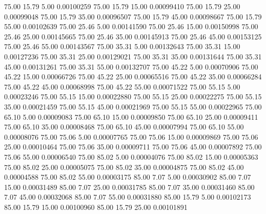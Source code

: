      75.00     15.79      5.00     0.00100259
     75.00     15.79     15.00     0.00099410
     75.00     15.79     25.00     0.00099048
     75.00     15.79     35.00     0.00096507
     75.00     15.79     45.00     0.00098667
     75.00     15.79     55.00     0.00102639
     75.00     25.46      5.00     0.00141590
     75.00     25.46     15.00     0.00150998
     75.00     25.46     25.00     0.00145665
     75.00     25.46     35.00     0.00145913
     75.00     25.46     45.00     0.00153125
     75.00     25.46     55.00     0.00143567
     75.00     35.31      5.00     0.00132643
     75.00     35.31     15.00     0.00127236
     75.00     35.31     25.00     0.00129021
     75.00     35.31     35.00     0.00131644
     75.00     35.31     45.00     0.00131261
     75.00     35.31     55.00     0.00132707
     75.00     45.22      5.00     0.00070906
     75.00     45.22     15.00     0.00066726
     75.00     45.22     25.00     0.00065516
     75.00     45.22     35.00     0.00066284
     75.00     45.22     45.00     0.00068998
     75.00     45.22     55.00     0.00071522
     75.00     55.15      5.00     0.00023246
     75.00     55.15     15.00     0.00022880
     75.00     55.15     25.00     0.00022275
     75.00     55.15     35.00     0.00021459
     75.00     55.15     45.00     0.00021969
     75.00     55.15     55.00     0.00022965
     75.00     65.10      5.00     0.00009083
     75.00     65.10     15.00     0.00009850
     75.00     65.10     25.00     0.00009411
     75.00     65.10     35.00     0.00008468
     75.00     65.10     45.00     0.00007994
     75.00     65.10     55.00     0.00008076
     75.00     75.06      5.00     0.00007765
     75.00     75.06     15.00     0.00009869
     75.00     75.06     25.00     0.00010464
     75.00     75.06     35.00     0.00009711
     75.00     75.06     45.00     0.00007892
     75.00     75.06     55.00     0.00006540
     75.00     85.02      5.00     0.00004076
     75.00     85.02     15.00     0.00005363
     75.00     85.02     25.00     0.00005075
     75.00     85.02     35.00     0.00004875
     75.00     85.02     45.00     0.00004588
     75.00     85.02     55.00     0.00003175
     85.00      7.07      5.00     0.00030902
     85.00      7.07     15.00     0.00031489
     85.00      7.07     25.00     0.00031785
     85.00      7.07     35.00     0.00031460
     85.00      7.07     45.00     0.00032068
     85.00      7.07     55.00     0.00031880
     85.00     15.79      5.00     0.00102173
     85.00     15.79     15.00     0.00100960
     85.00     15.79     25.00     0.00101891
